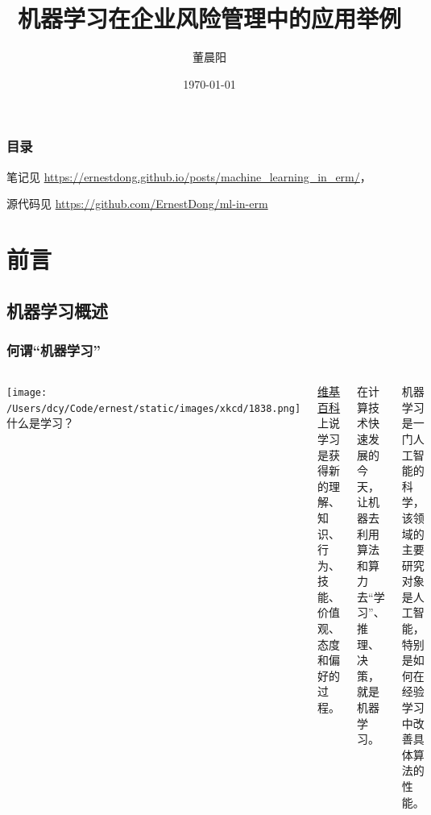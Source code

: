 \documentclass[mathserif,envcountsect,fontset=mac]{ctexbeamer}
\author{董晨阳}
\date{\today}
\title{机器学习在企业风险管理中的应用举例}
\begin{document}
\maketitle
\begin{frame}
    \frametitle{目录}
    \tableofcontents[hideallsubsections]
    \small 笔记见 \url{https://ernestdong.github.io/posts/machine_learning_in_erm/}，

    \small 源代码见 \url{https://github.com/ErnestDong/ml-in-erm}
\end{frame}

\section{前言}
\subsection{机器学习概述}
\begin{frame}
    \frametitle{何谓“机器学习”}
    \begin{columns}
        \texttt{[image: /Users/dcy/Code/ernest/static/images/xkcd/1838.png]}
        什么是学习？

        \href{https://zh.wikipedia.org/wiki/\%E5\%AD\%A6\%E4\%B9\%A0}{维基百科}上说学习是获得新的理解、知识、行为、技能、价值观、态度和偏好的过程。

        在计算技术快速发展的今天，让机器去利用算法和算力去“学习”、推理、决策，就是机器学习。

        \begin{definition}
            机器学习是一门人工智能的科学，该领域的主要研究对象是人工智能，特别是如何在经验学习中改善具体算法的性能。
        \end{definition}
    \end{columns}
\end{frame}
\end{document}
